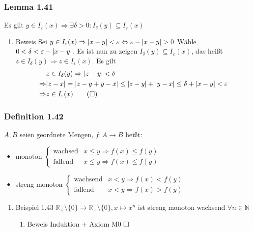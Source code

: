 \documentclass[11pt]{article}
\DeclarePairedDelimiter\abs{\lvert}{\rvert}%
\DeclareMathOperator{\Forall}{\forall}%
\begin{document}
\subsubsection{Lemma 1.41}
\label{sec-2-9-9}
Es gilt $y\in I_\varepsilon (x) \Rightarrow \exists \delta > 0: I_\delta (y) \subseteq I_\varepsilon (x)$
\begin{enumerate}
\item Beweis
\label{sec-2-9-9-1}
Sei $y\in I_\varepsilon (x) \Rightarrow \abs{x - y}  < \varepsilon \Leftrightarrow \varepsilon - \abs{x - y} > 0$
Wähle $0 < \delta < \varepsilon - \abs{x - y}$. Es ist nun zu zeigen $I_\delta (y) \subseteq I_\varepsilon (x)$, das heißt
$z\in I_\delta(y) \Rightarrow z\in I_\varepsilon(x)$. Es gilt
\begin{align}
&z\in I_\delta (y) \Rightarrow \abs{z - y}  <\delta \\
\Rightarrow &\abs{z - x} = \abs{z - y + y - x} \leq \abs{z - y} + \abs{y - x} \leq \delta + \abs{x - y} < \varepsilon \\
\Rightarrow &z\in I_\varepsilon (x) \tag{$\square$}
\end{align}
\end{enumerate}
\subsubsection{Definition 1.42}
\label{sec-2-9-10}
$A,B$ seien geordnete Mengen, $f:A\to B$ heißt:
\begin{itemize}
\item monoton $\begin{cases} \text{wachsed} & x \leq y \Rightarrow f(x) \leq f(y)  \\ \text{fallend} & x \leq y \Rightarrow  f(x) \leq f(y) \end{cases}$
\item streng monoton $\begin{cases} \text{wachsend} & x < y \Rightarrow f(x) < f(y) \\ \text{fallend} & x < y \Rightarrow f(x) > f(y) \end{cases}$
\end{itemize}
\begin{enumerate}
\item Beispiel 1.43
\label{sec-2-9-10-1}
$\mathbb{R}_+\setminus \{0\} \to \mathbb{R}_+\setminus\{0\}, x\mapsto x^n$ ist streng monoton wachsend $\Forall n\in\mathbb{N}$
\begin{enumerate}
\item Beweis
\label{sec-2-9-10-1-1}
Induktion + Axiom M0 $\hfill\square$
\end{enumerate}
\end{enumerate}
\end{document}
